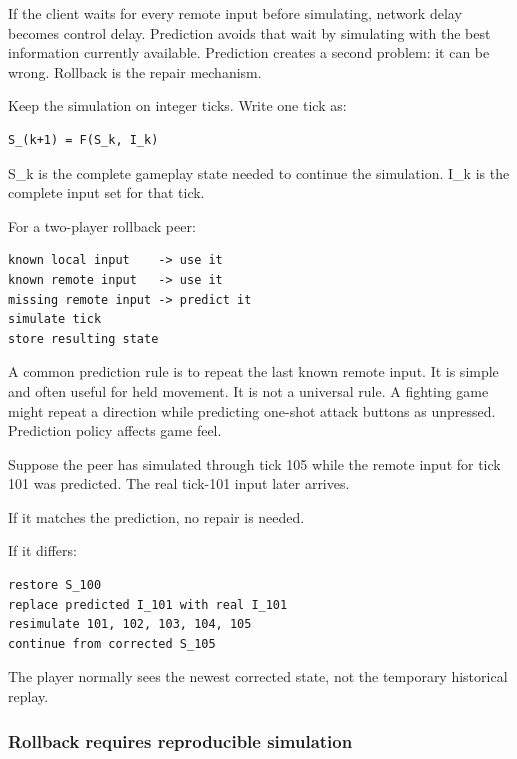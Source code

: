 If the client waits for every remote input before simulating, network delay becomes control delay. Prediction avoids that wait by simulating with the best information currently available. Prediction creates a second problem: it can be wrong. Rollback is the repair mechanism.

Keep the simulation on integer ticks. Write one tick as:

\begin{verbatim}
S_(k+1) = F(S_k, I_k)
\end{verbatim}

S\_k is the complete gameplay state needed to continue the simulation. I\_k is the complete input set for that tick.

For a two-player rollback peer:

\begin{verbatim}
known local input    -> use it
known remote input   -> use it
missing remote input -> predict it
simulate tick
store resulting state
\end{verbatim}

A common prediction rule is to repeat the last known remote input. It is simple and often useful for held movement. It is not a universal rule. A fighting game might repeat a direction while predicting one-shot attack buttons as unpressed. Prediction policy affects game feel.

Suppose the peer has simulated through tick 105 while the remote input for tick 101 was predicted. The real tick-101 input later arrives.

If it matches the prediction, no repair is needed.

If it differs:

\begin{verbatim}
restore S_100
replace predicted I_101 with real I_101
resimulate 101, 102, 103, 104, 105
continue from corrected S_105
\end{verbatim}

The player normally sees the newest corrected state, not the temporary historical replay.

\subsubsection{Rollback requires reproducible simulation}\label{06-engine-ii-ch047-rollback-requires-reproducible-simulation}

\hypertarget{06-engine-ii-ch047-rollback-requires-reproducible-simulation}{}

